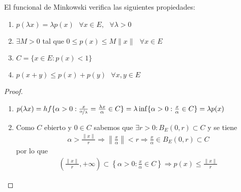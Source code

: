 \begin{propiedades}
    El funcional de Minkowski verifica las siguientes propiedades:
    \begin{enumerate}
        \item $p(\lambda x) = \lambda p(x)  \ \ \ \forall x \in E, \ \ \ \forall \lambda >0$
        \item $\exists M>0$ tal que $0\leq p(x)\leq M\|x\|\ \ \ \forall x \in E$
        \item $C=\{x\in E : p(x)<1\}$
        \item $p(x+y)\leq p(x) + p(y) \ \ \ \forall x,y\in E$
    \end{enumerate}

    \begin{proof}\
        \begin{enumerate}
            \item $p(\lambda x ) = hf\{\alpha>0 : \frac{x}{\nicefrac{\alpha}{\lambda}} = \frac{\lambda x}{\alpha}\in C\} = \lambda \inf\{\alpha>0 : \frac{x}{\alpha}\in C\} = \lambda p(x)$

            \item Como $C$ ebierto y $0\in C$ sabemos que $\exists r>0 : B_E(0,r)\subset C$ y se tiene
            \begin{gather*}
                \alpha > \frac{\|x\|}{r} \Rightarrow \left\| \frac{x}{\alpha} \right\| < r \Rightarrow \frac{x}{\alpha}\in B_E(0,r)\subset C
            \end{gather*}
            por lo que 
            \begin{gather*}
                \left(\frac{\|x\|}{r}, +\infty\right)\subset \left\{\alpha>0 : \frac{x}{\alpha}\in C\right\} \Rightarrow p(x) \leq \frac{\|x\|}{r}
            \end{gather*}


\end{enumerate}
\end{proof}
\end{propiedades}
